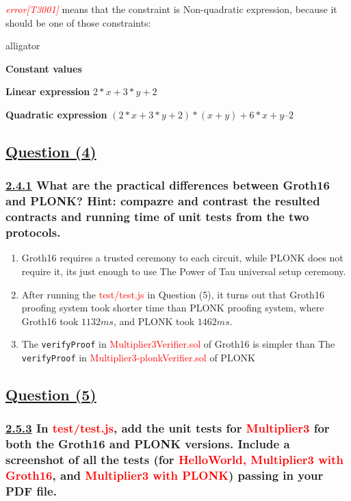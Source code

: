 \documentclass[letterpaper, 10 pt, conference]{ieeeconf}  %
\begin{document}
\textcolor{red}{\textit{error[T3001]}} means that the constraint is Non-quadratic expression, because it should be one of those constraints: \cite{c7}

\begin{labeling}{alligator}
\item [\textbf{Constant values}] 
\item [\textbf{Linear expression}]    $2*x + 3*y + 2$
\item [\textbf{Quadratic expression}] $(2*x + 3*y + 2) * (x+y) + 6*x + y – 2$ 
\end{labeling}  

\subsection{\textbf{\underline{Question (4)}}}
\subsubsection{\textbf{\underline{2.4.1} What are the practical differences between Groth16 and PLONK? Hint: compazre and contrast the resulted contracts and running time of unit tests from the two protocols. }}

\begin{enumerate}
  \item Groth16 requires a trusted ceremony to each circuit, while PLONK does not require it, its just enough to use The Power of Tau universal setup ceremony. \cite{c8}
  \item After running the \textcolor{red}{test/test.js} in Question (5), it turns out that Groth16 proofing system took shorter time than PLONK proofing system, where Groth16 took $1132ms$, and PLONK took $1462ms$.
  \item The \texttt{verifyProof} in \textcolor{red}{Multiplier3Verifier.sol} of Groth16 is simpler than The \texttt{verifyProof} in \textcolor{red}{Multiplier3-plonkVerifier.sol} of PLONK
\end{enumerate}

\subsection{\textbf{\underline{Question (5)}}}
\subsubsection{\textbf{\underline{2.5.3} In \textcolor{red}{test/test.js}, add the unit tests for \textcolor{red}{Multiplier3} for both the Groth16 and PLONK versions. Include a screenshot of all the tests (for \textcolor{red}{HelloWorld, Multiplier3 with Groth16}, and \textcolor{red}{Multiplier3 with PLONK}) passing in your PDF file.}}
\end{document}
